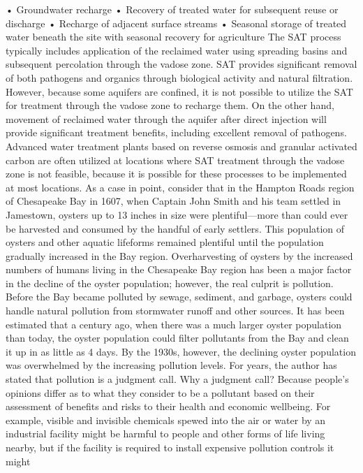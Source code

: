 \documentclass{article}
\begin{document}
• Groundwater recharge • Recovery of treated water for subsequent reuse
or discharge • Recharge of adjacent surface streams • Seasonal storage
of treated water beneath the site with seasonal recovery for agriculture
The SAT process typically includes application of the reclaimed water
using spreading basins and subsequent percolation through the vadose
zone. SAT provides significant removal of both pathogens and organics
through biological activity and natural filtration. However, because
some aquifers are confined, it is not possible to utilize the SAT for
treatment through the vadose zone to recharge them. On the other hand,
movement of reclaimed water through the aquifer after direct injection
will provide significant treatment benefits, including excellent removal
of pathogens. Advanced water treatment plants based on reverse osmosis
and granular activated carbon are often utilized at locations where SAT
treatment through the vadose zone is not feasible, because it is
possible for these processes to be implemented at most locations. As a
case in point, consider that in the Hampton Roads region of Chesapeake
Bay in 1607, when Captain John Smith and his team settled in Jamestown,
oysters up to 13 inches in size were plentiful---more than could ever be
harvested and consumed by the handful of early settlers. This population
of oysters and other aquatic lifeforms remained plentiful until the
population gradually increased in the Bay region. Overharvesting of
oysters by the increased numbers of humans living in the Chesapeake Bay
region has been a major factor in the decline of the oyster population;
however, the real culprit is pollution. Before the Bay became polluted
by sewage, sediment, and garbage, oysters could handle natural pollution
from stormwater runoff and other sources. It has been estimated that a
century ago, when there was a much larger oyster population than today,
the oyster population could filter pollutants from the Bay and clean it
up in as little as 4 days. By the 1930s, however, the declining oyster
population was overwhelmed by the increasing pollution levels. For
years, the author has stated that pollution is a judgment call. Why a
judgment call? Because people's opinions differ as to what they consider
to be a pollutant based on their assessment of benefits and risks to
their health and economic wellbeing. For example, visible and invisible
chemicals spewed into the air or water by an industrial facility might
be harmful to people and other forms of life living nearby, but if the
facility is required to install expensive pollution controls it might
\end{document}
